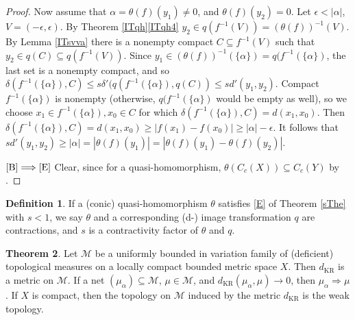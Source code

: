 \documentclass[sn-mathphys-num]{sn-jnl}%
\theoremstyle{thmstyleone}%
\theoremstyle{definition}
\newtheorem{theorem}{Theorem}%
\newtheorem{definition}[theorem]{Definition}
\begin{document}
\begin{proof}
Now assume that  $ \alpha = \theta(f) (y_1) \neq 0$, and $ \theta(f) (y_2) = 0$. Let $ \epsilon < | \alpha|$, $V = ( -\epsilon, \epsilon)$.
By Theorem \ref{ITqh}\ref{ITqh4}  $y_2 \in q(f^{-1}(V)) = (\theta(f))^{-1}(V)$.
By Lemma \ref{ITsvva} there is a nonempty compact $C \subseteq f^{-1}(V)$ such that $y_2 \in q(C) \subseteq q(f^{-1}(V))$.
Since $y_1 \in   (\theta(f))^{-1}(\{\alpha\}) = q( f^{-1}(\{\alpha\} )$, the last set is  a nonempty compact, and so 
$ \delta( f^{-1}(\{\alpha\}), C ) \le s \delta'(q(f^{-1}(\{\alpha\}), q(C)) \le s d'(y_1, y_2).$
Compact $ f^{-1}(\{ \alpha\})$ is nonempty (otherwise, $q( f^{-1}(\{\alpha\} )$ would be empty as well), so
we choose $x_1 \in f^{-1}(\{ \alpha\}), x_0 \in C$ for which $\delta( f^{-1}(\{\alpha\}), C )  = d(x_1, x_0) $. Then 
$ \delta( f^{-1}(\{\alpha\}), C )  = d(x_1, x_0)  \ge | f(x_1) - f(x_0) | \ge |\alpha| - \epsilon.$
It follows that
$ s d'(y_1, y_2) \ge  | \alpha| =   |\theta(f) (y_1)| =  |\theta(f) (y_1) - \theta(f) (y_2)|. $

$\ref{B}  \Longrightarrow  \ref{E}$ Clear, since for a quasi-homomorphism, $\theta(C_c(X)) \subseteq C_c(Y)$ by \cite[Th. 65, Sect. 4]{Butler:QLM}.

\end{proof} 

\begin{definition}
If a (conic) quasi-homomorphism $\theta$ satisfies \ref{E} of Theorem \ref{sThe} with $ s <1$, 
we say $\theta$ and  a corresponding (d-) image transformation $q$ are
contractions, and $s$ is a contractivity factor of $\theta$ and $q$. 
\end{definition} 

\begin{theorem} \label{KRisMetr}
Let $\mathcal{M} $ be a uniformly bounded in variation family of (deficient) topological measures on a locally compact bounded metric space  $X$.
Then  $d_{\text{KR}}$ is a metric on $\mathcal{M} $.
If a net $(\mu_{\alpha}) \subseteq \mathcal{M} $, $\mu  \in  \mathcal{M} $, and $ d_{\text{KR}} ( \mu_{\alpha}, \mu) \longrightarrow 0$, 
then $ \mu_{\alpha} \Longrightarrow \mu$. 
If $X$ is compact, then the topology on $ \mathcal{M}$ induced  by the metric $ d_{\text{KR}}$ is the weak topology.
\end{theorem}
\end{document}

